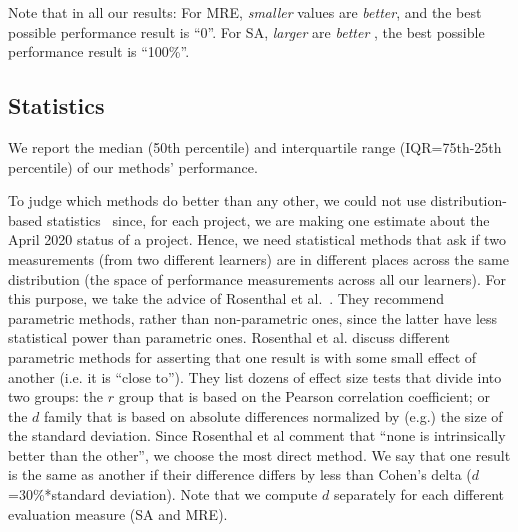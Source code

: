 \documentclass[sigconf,review,anonymous]{acmart}
\newcommand{\bi}{\begin{itemize}}
\newcommand{\ei}{\end{itemize}}
\begin{document}
Note that in all our results: For MRE, {\em smaller}  values are {\em better}, and the best possible performance result is ``0''. For SA,  {\em larger} are {\em better }, the best possible performance result is ``100\%''.


\subsection{Statistics}
\label{sect:stats} 
We report the median (50th percentile) and interquartile range (IQR=75th-25th percentile) of our methods' performance.  


To judge which methods do better than any other,   we could not use distribution-based statistics~\cite{kampenes2007systematic,arcuri2011practical,mittas2012ranking} since, for each project, we are making one estimate about the April 2020 status of a  project.  Hence, we need statistical
methods that ask if two measurements (from two different learners) are in different places
across the same distribution (the space of performance measurements across all our  learners).
For this purpose, we take the advice of  Rosenthal et al.~\cite{rosenthal1994parametric}. They recommend parametric methods, rather than non-parametric ones, since  the latter   have  less statistical power than parametric ones. 
 Rosenthal et al. discuss different parametric methods for asserting that one result is with some small effect of another (i.e. it is ``close to'').
 They list dozens of effect size tests that divide into two groups:    the $r$ group that is based on the Pearson correlation coefficient; or the $d$ family that is based on absolute differences normalized by (e.g.) the size of the standard deviation.   
 Since Rosenthal et al comment that ``none is intrinsically better than the other'', we choose the most direct method. 
 We say that one result is the same as another if their difference  
 differs by less than  Cohen's delta ($d$=30\%*standard deviation). 
 Note that we compute $d$ separately for each different evaluation measure  (SA and MRE).
 

\
\end{document}
